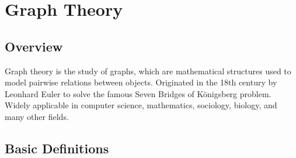 \documentclass{article}
\theoremstyle{plain}%
\theoremstyle{definition}
\theoremstyle{remark}
\begin{document}
	
	
	


	






	\section{Graph Theory}
	\subsection{Overview}
	Graph theory is the study of graphs, which are mathematical structures used to model pairwise relations between objects.
	Originated in the 18th century by Leonhard Euler to solve the famous Seven Bridges of Königsberg problem.
	Widely applicable in computer science, mathematics, sociology, biology, and many other fields.

	\subsection{Basic Definitions}
\end{document}
